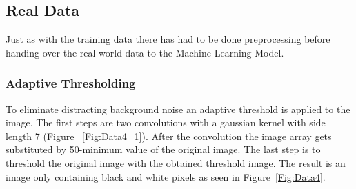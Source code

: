 \documentclass[@CLASSOPTIONS@]{tumarticle}
\begin{document}
\subsection{Real Data}
\label{realdata}
Just as with the training data there has had to be done preprocessing before handing
over the real world data to the Machine Learning Model.

\subsubsection{Adaptive Thresholding}

To eliminate distracting background noise an adaptive threshold is applied to the
image.
The first steps are two convolutions with a gaussian kernel with side length 7 (Figure ~\ref{Fig:Data4_1}).
After the convolution the image array gets substituted by 50-minimum value of the original image.
The last step is to threshold the original image with the obtained threshold image.
The result is an image only containing black and white pixels as seen in Figure~\ref{Fig:Data4}.
\end{document}
